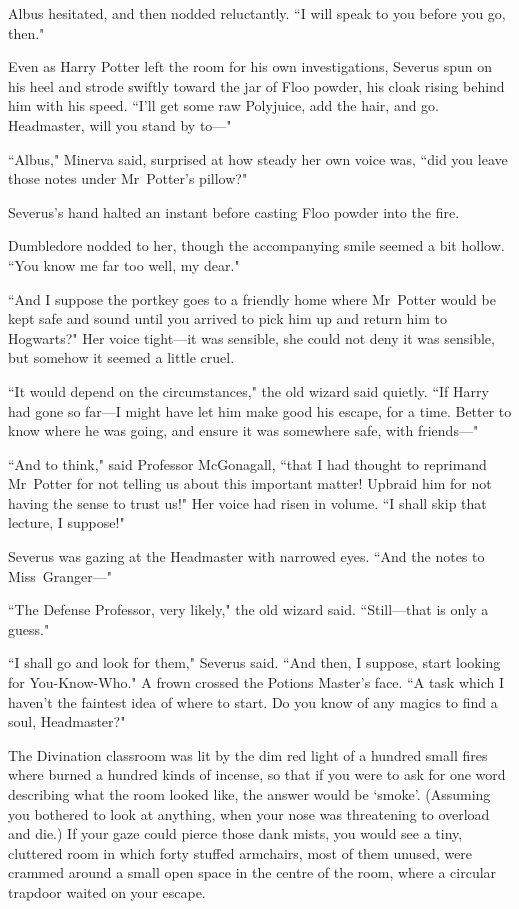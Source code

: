 Albus hesitated, and then nodded reluctantly. ``I will speak to you before you go, then."

\later

Even as Harry Potter left the room for his own investigations, Severus spun on his heel and strode swiftly toward the jar of Floo powder, his cloak rising behind him with his speed. ``I'll get some raw Polyjuice, add the hair, and go. Headmaster, will you stand by to—"

``Albus," Minerva said, surprised at how steady her own voice was, ``did you leave those notes under Mr~Potter's pillow?"

Severus's hand halted an instant before casting Floo powder into the fire.

Dumbledore nodded to her, though the accompanying smile seemed a bit hollow. ``You know me far too well, my dear."

``And I suppose the portkey goes to a friendly home where Mr~Potter would be kept safe and sound until you arrived to pick him up and return him to Hogwarts?" Her voice tight—it was sensible, she could not deny it was sensible, but somehow it seemed a little cruel.

``It would depend on the circumstances," the old wizard said quietly. ``If Harry had gone so far—I might have let him make good his escape, for a time. Better to know where he was going, and ensure it was somewhere safe, with friends—"

``And to think," said Professor McGonagall, ``that I had thought to reprimand Mr~Potter for not telling us about this important matter! Upbraid him for not having the sense to trust us!" Her voice had risen in volume. ``I shall skip that lecture, I suppose!"

Severus was gazing at the Headmaster with narrowed eyes. ``And the notes to Miss~Granger—"

``The Defense Professor, very likely," the old wizard said. ``Still—that is only a guess."

``I shall go and look for them," Severus said. ``And then, I suppose, start looking for You-Know-Who." A frown crossed the Potions Master's face. ``A task which I haven't the faintest idea of where to start. Do you know of any magics to find a soul, Headmaster?"

\later

The Divination classroom was lit by the dim red light of a hundred small fires where burned a hundred kinds of incense, so that if you were to ask for one word describing what the room looked like, the answer would be `smoke'. (Assuming you bothered to look at anything, when your nose was threatening to overload and die.) If your gaze could pierce those dank mists, you would see a tiny, cluttered room in which forty stuffed armchairs, most of them unused, were crammed around a small open space in the centre of the room, where a circular trapdoor waited on your escape.

